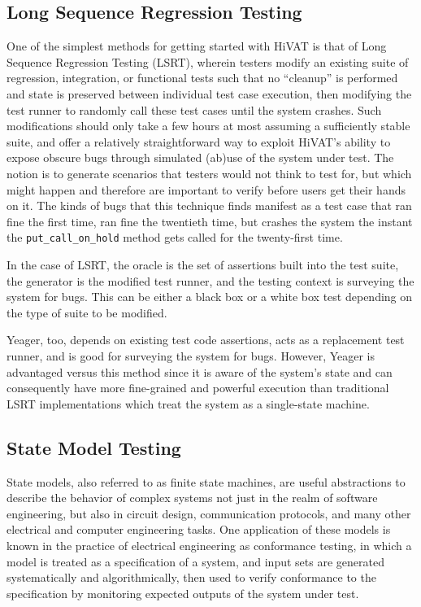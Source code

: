 \subsection{Long Sequence Regression Testing}
One of the simplest methods for getting started with HiVAT is that of Long Sequence Regression Testing (LSRT), wherein testers modify an existing suite of regression, integration, or functional tests such that no ``cleanup'' is performed and state is preserved between individual test case execution, then modifying the test runner to randomly call these test cases until the system crashes. Such modifications should only take a few hours at most assuming a sufficiently stable suite, and offer a relatively straightforward way to exploit HiVAT's ability to expose obscure bugs through simulated (ab)use of the system under test. The notion is to generate scenarios that testers would not think to test for, but which might happen and therefore are important to verify before users get their hands on it. The kinds of bugs that this technique finds manifest as a test case that ran fine the first time, ran fine the twentieth time, but crashes the system the instant the \texttt{put\_call\_on\_hold} method gets called for the twenty-first time.

In the case of LSRT, the oracle is the set of assertions built into the test suite, the generator is the modified test runner, and the testing context is surveying the system for bugs. This can be either a black box or a white box test depending on the type of suite to be modified.

Yeager, too, depends on existing test code assertions, acts as a replacement test runner, and is good for surveying the system for bugs. However, Yeager is advantaged versus this method since it is aware of the system's state and can consequently have more fine-grained and powerful execution than traditional LSRT implementations which treat the system as a single-state machine.

\subsection{State Model Testing}
State models, also referred to as finite state machines, are useful abstractions to describe the behavior of complex systems not just in the realm of software engineering, but also in circuit design, communication protocols, and many other electrical and computer engineering tasks. One application of these models is known in the practice of electrical engineering as conformance testing, in which a model is treated as a specification of a system, and input sets are generated systematically and algorithmically, then used to verify conformance to the specification by monitoring expected outputs of the system under test.\citep{lee1996principles}


